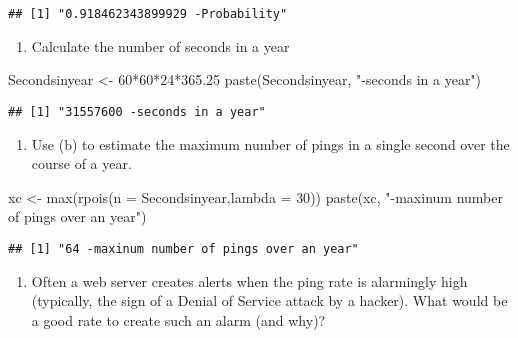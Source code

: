 \documentclass[
]{article}
\newenvironment{Shaded}{\begin{snugshade}}{\end{snugshade}}
\newcommand{\AttributeTok}[1]{\textcolor[rgb]{0.77,0.63,0.00}{#1}}
\newcommand{\DecValTok}[1]{\textcolor[rgb]{0.00,0.00,0.81}{#1}}
\newcommand{\FloatTok}[1]{\textcolor[rgb]{0.00,0.00,0.81}{#1}}
\newcommand{\FunctionTok}[1]{\textcolor[rgb]{0.00,0.00,0.00}{#1}}
\newcommand{\NormalTok}[1]{#1}
\newcommand{\OtherTok}[1]{\textcolor[rgb]{0.56,0.35,0.01}{#1}}
\newcommand{\SpecialCharTok}[1]{\textcolor[rgb]{0.00,0.00,0.00}{#1}}
\newcommand{\StringTok}[1]{\textcolor[rgb]{0.31,0.60,0.02}{#1}}
\providecommand{\tightlist}{%
  \setlength{\itemsep}{0pt}\setlength{\parskip}{0pt}}
\begin{document}
\begin{verbatim}
## [1] "0.918462343899929 -Probability"
\end{verbatim}

\begin{enumerate}
\def\labelenumi{\alph{enumi}.}
\setcounter{enumi}{1}
\tightlist
\item
  Calculate the number of seconds in a year
\end{enumerate}

\begin{Shaded}
\begin{Highlighting}[]
\NormalTok{Secondsinyear }\OtherTok{\textless{}{-}} \DecValTok{60}\SpecialCharTok{*}\DecValTok{60}\SpecialCharTok{*}\DecValTok{24}\SpecialCharTok{*}\FloatTok{365.25}
\FunctionTok{paste}\NormalTok{(Secondsinyear, }\StringTok{"{-}seconds in a year"}\NormalTok{)}
\end{Highlighting}
\end{Shaded}

\begin{verbatim}
## [1] "31557600 -seconds in a year"
\end{verbatim}

\begin{enumerate}
\def\labelenumi{\alph{enumi}.}
\setcounter{enumi}{2}
\tightlist
\item
  Use (b) to estimate the maximum number of pings in a single second
  over the course of a year.
\end{enumerate}

\begin{Shaded}
\begin{Highlighting}[]
\NormalTok{xc }\OtherTok{\textless{}{-}} \FunctionTok{max}\NormalTok{(}\FunctionTok{rpois}\NormalTok{(}\AttributeTok{n =}\NormalTok{ Secondsinyear,}\AttributeTok{lambda =} \DecValTok{30}\NormalTok{))}
\FunctionTok{paste}\NormalTok{(xc, }\StringTok{"{-}maxinum number of pings over an year"}\NormalTok{)}
\end{Highlighting}
\end{Shaded}

\begin{verbatim}
## [1] "64 -maxinum number of pings over an year"
\end{verbatim}

\begin{enumerate}
\def\labelenumi{\alph{enumi}.}
\setcounter{enumi}{3}
\tightlist
\item
  Often a web server creates alerts when the ping rate is alarmingly
  high (typically, the sign of a Denial of Service attack by a hacker).
  What would be a good rate to create such an alarm (and why)?
\end{enumerate}
\end{document}
